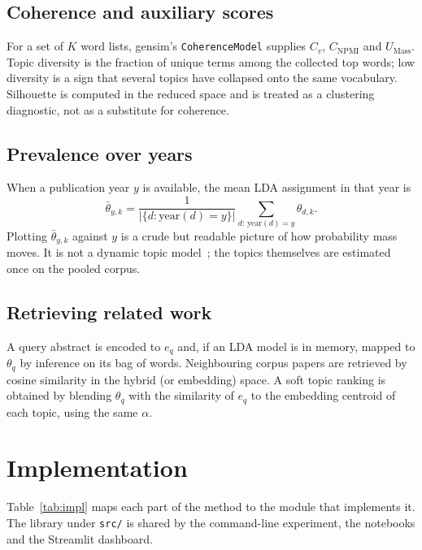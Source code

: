 \documentclass[11pt,a4paper]{article}
\begin{document}
\subsection{Coherence and auxiliary scores}
For a set of $K$ word lists, gensim's \texttt{CoherenceModel} supplies $C_v$, $C_{\mathrm{NPMI}}$ and $U_{\mathrm{Mass}}$. Topic diversity is the fraction of unique terms among the collected top words; low diversity is a sign that several topics have collapsed onto the same vocabulary. Silhouette is computed in the reduced space and is treated as a clustering diagnostic, not as a substitute for coherence.

\subsection{Prevalence over years}
When a publication year $y$ is available, the mean LDA assignment in that year is
\begin{equation}
  \bar\theta_{y,k}
  = \frac{1}{|\{d:\mathrm{year}(d)=y\}|}
    \sum_{d:\,\mathrm{year}(d)=y} \theta_{d,k}.
\end{equation}
Plotting $\bar\theta_{y,k}$ against $y$ is a crude but readable picture of how probability mass moves. It is not a dynamic topic model~\cite{blei2006}; the topics themselves are estimated once on the pooled corpus.

\subsection{Retrieving related work}
A query abstract is encoded to $e_q$ and, if an LDA model is in memory, mapped to $\theta_q$ by inference on its bag of words. Neighbouring corpus papers are retrieved by cosine similarity in the hybrid (or embedding) space. A soft topic ranking is obtained by blending $\theta_q$ with the similarity of $e_q$ to the embedding centroid of each topic, using the same $\alpha$.

\section{Implementation}
\label{sec:impl}

Table~\ref{tab:impl} maps each part of the method to the module that implements it. The library under \texttt{src/} is shared by the command-line experiment, the notebooks and the Streamlit dashboard.
\end{document}
